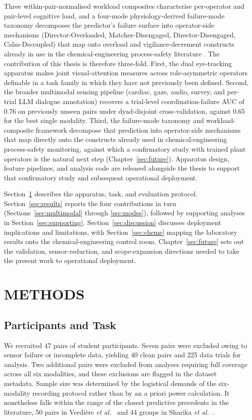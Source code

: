 Three within-pair-normalised workload composites characterise per-operator and pair-level cognitive load, and a four-mode physiology-derived failure-mode taxonomy decomposes the predictor's failure surface into operator-side mechanisms (Director-Overloaded, Matcher-Disengaged, Director-Disengaged, Calm-Decoupled) that map onto overload and vigilance-decrement constructs already in use in the chemical-engineering process-safety literature \cite{bhavsar2017eye,iqbal2024multi,iqbal2020dynamic}. The contribution of this thesis is therefore three-fold. First, the dual eye-tracking apparatus makes joint visual-attention measures across role-asymmetric operators definable in a task family in which they have not previously been defined. Second, the broader multimodal sensing pipeline (cardiac, gaze, audio, survey, and per-trial LLM dialogue annotation) recovers a trial-level coordination-failure AUC of $0.76$ on previously unseen pairs under dyad-disjoint cross-validation, against $0.65$ for the best single modality. Third, the failure-mode taxonomy and workload-composite framework decompose that prediction into operator-side mechanisms that map directly onto the constructs already used in chemical-engineering process-safety monitoring, against which a confirmatory study with trained plant operators is the natural next step (Chapter~\ref{sec:future}). Apparatus design, feature pipelines, and analysis code are released alongside the thesis to support that confirmatory study and subsequent operational deployment.

Section~\ref{sec:methods} describes the apparatus, task, and evaluation protocol. Section~\ref{sec:results} reports the four contributions in turn (Sections~\ref{sec:multimodal} through \ref{sec:modes}), followed by supporting analyses in Section~\ref{sec:supporting}. Section~\ref{sec:discussion} discusses deployment implications and limitations, with Section~\ref{sec:cheme} mapping the laboratory results onto the chemical-engineering control room. Chapter~\ref{sec:future} sets out the validation, sensor-reduction, and scope-expansion directions needed to take the present work to operational deployment.


\chapter{METHODS}\label{sec:methods}

\section{Participants and Task}
We recruited 47 pairs of student participants. Seven pairs were excluded owing to sensor failure or incomplete data, yielding 40 clean pairs and 225 data trials for analysis. Two additional pairs were excluded from analyses requiring full coverage across all six modalities, and these exclusions are flagged in the dataset metadata. Sample size was determined by the logistical demands of the six-modality recording protocol rather than by an a priori power calculation. It nonetheless falls within the range of the closest predictive precedents in the literature, 50 pairs in Verdi\`ere \emph{et al.}~\cite{verdiere2020thms} and 44 groups in Sharika \emph{et al.}~\cite{sharika2024heart}.

